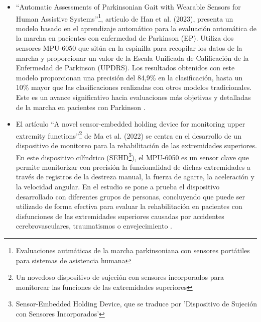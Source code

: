 \begin{itemize}
    \item ``Automatic Assessments of Parkinsonian Gait with Wearable Sensors for Human Assistive Systems''\footnote{Evaluaciones autmáticas de la marcha parkinsoniana con sensores portátiles para sistemas de asistencia humana}, artículo de Han et al. (2023), presenta un modelo basado en el aprendizaje automático para la evaluación automática de la marcha en pacientes con enfermedad de Parkinson (EP). Utiliza dos sensores MPU-6050 que sitúa en la espinilla para recopilar los datos de la marcha y proporcionar un valor de la Escala Unificada de Calificación de la Enfermedad de Parkinson (UPDRS). Los resultados obtenidos con este modelo proporcionan una precisión del 84,9\% en la clasificación, hasta un 10\% mayor que las clasificaciones realizadas con otros modelos tradicionales. Este es un avance significativo hacia evaluaciones más objetivas y detalladas de la marcha en pacientes con Parkinson \cite{AutomaticAssessments}.
    
    \item El artículo ``A novel sensor-embedded holding device for monitoring upper extremity functions''\footnote{Un novedoso dispositivo de sujeción con sensores incorporados para monitorear las funciones de las extremidades superiores} de Ma et al. (2022) se centra en el desarrollo de un dispositivo de monitoreo para la rehabilitación de las extremidades superiores. En este dispositivo cilíndrico (SEHD\footnote{Sensor-Embedded Holding Device, que se traduce por 'Dispositivo de Sujeción con Sensores Incorporados'}), el MPU-6050 es un sensor clave que permite monitorizar con precisión la funcionalidad de dichas extremidades a través de registros de la destreza manual, la fuerza de agarre, la aceleración y la velocidad angular. En el estudio se pone a prueba el dispositivo desarrollado con diferentes grupos de personas, concluyendo que puede ser utilizado de forma efectiva para evaluar la rehabilitación en pacientes con disfunciones de las extremidades superiores causadas por accidentes cerebrovasculares, traumatismos o envejecimiento \cite{NovelSensor}.


\end{itemize}
